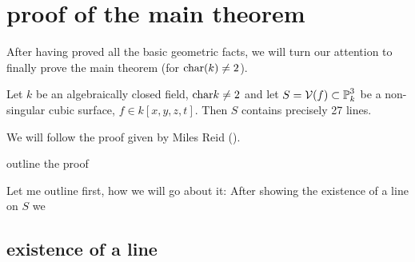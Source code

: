 \section{proof of the main theorem}

After having proved all the basic geometric facts, we will turn our attention to finally prove the main theorem (for ${\operatorname{char}}(k) \neq 2$).
\begin{theorem}
Let $k$ be an algebraically closed field, ${\operatorname{char }} k \neq 2$ and let $S = \operatorname{\mathcal V}(f) \subset \operatorname{\mathbb P}^3_k$ be a non-singular cubic surface, $f\in k[x,y,z,t]$.
Then $S$ contains precisely 27 lines.
\end{theorem}
We will follow the proof given by Miles Reid (\cite[§7]{reid1988undergraduate}).
\begin{todo}
\item outline the proof
\item Let me outline first, how we will go about it:
After showing the existence of a line on $S$ we 
\end{todo}


\subsection{existence of a line}

